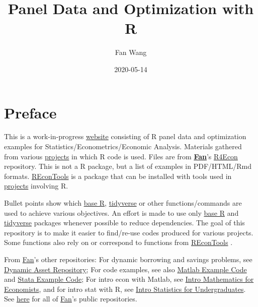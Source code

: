\documentclass[
]{book}
\title{Panel Data and Optimization with R}
\author{Fan Wang}
\date{2020-05-14}
\begin{document}
\maketitle

{
\hypersetup{linkcolor=}
\setcounter{tocdepth}{1}
\tableofcontents
}
\hypertarget{preface}{%
\chapter*{Preface}\label{preface}}

This is a work-in-progress \href{https://fanwangecon.github.io/R4Econ/}{website} consisting of R panel data and optimization examples for Statistics/Econometrics/Economic Analysis. Materials gathered from various \href{https://fanwangecon.github.io/research}{projects} in which R code is used. Files are from \href{https://fanwangecon.github.io/}{\textbf{Fan}}'s \href{https://github.com/FanWangEcon/R4Econ}{R4Econ} repository. This is not a R package, but a list of examples in PDF/HTML/Rmd formats. \href{https://fanwangecon.github.io/REconTools/}{REconTools} is a package that can be installed with tools used in \href{https://fanwangecon.github.io/research}{projects} involving R.

Bullet points show which \href{https://www.rdocumentation.org/packages/base/versions/3.5.2}{base R}, \href{https://www.tidyverse.org/}{tidyverse} or other functions/commands are used to achieve various objectives. An effort is made to use only \href{https://www.rdocumentation.org/packages/base/versions/3.5.2}{base R} \citep{R-base} and \href{https://www.tidyverse.org/}{tidyverse} \citep{R-tidyverse} packages whenever possible to reduce dependencies. The goal of this repository is to make it easier to find/re-use codes produced for various projects. Some functions also rely on or correspond to functions from \href{https://fanwangecon.github.io/REconTools/}{REconTools} \citep{R-REconTools}.

From \href{https://fanwangecon.github.io/}{Fan}'s other repositories: For dynamic borrowing and savings problems, see \href{https://fanwangecon.github.io/CodeDynaAsset/}{Dynamic Asset Repository}; For code examples, see also \href{https://fanwangecon.github.io/M4Econ/}{Matlab Example Code} and \href{https://fanwangecon.github.io/Stata4Econ/}{Stata Example Code}; For intro econ with Matlab, see \href{https://fanwangecon.github.io/Math4Econ/}{Intro Mathematics for Economists}, and for intro stat with R, see \href{https://fanwangecon.github.io/Stat4Econ/}{Intro Statistics for Undergraduates}. See \href{https://github.com/FanWangEcon}{here} for all of \href{https://fanwangecon.github.io/}{Fan}'s public repositories.
\end{document}
